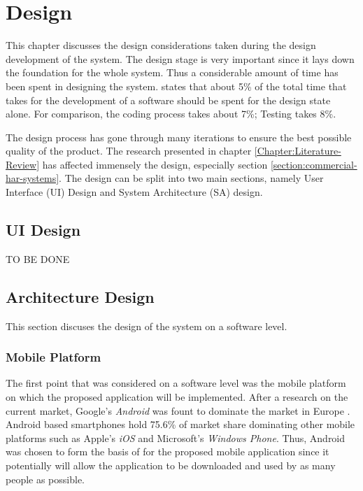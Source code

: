 \chapter{Design}
\label{Chapter:Design}

This chapter discusses the design considerations taken during the design development of the system. The design stage is very important since it lays down the foundation for the whole system.
Thus a considerable amount of time has been spent in designing the system. \citet[12]{bell2005} states that about 5\% of the total time that takes for the development of a software should be spent for the design state alone. For comparison, the coding process takes about 7\%; Testing takes 8\%. 

The design process has gone through many iterations to ensure the best possible quality of the product. The research presented in chapter \ref{Chapter:Literature-Review} has affected immensely the design, especially section \ref{section:commercial-har-systems}. The design can be split into two main sections, namely User Interface (UI) Design and System Architecture (SA) design.

    \section{UI Design}
    TO BE DONE
    
    \section{Architecture Design}
    This section discuses the design of the system on a software level.
    
        \subsection{Mobile Platform}
        The first point that was considered on a software level was the mobile platform on which the proposed application will be implemented. After a research on the current market, Google's \textit{Android} was fount to dominate the market in Europe \citep{williams2016}. Android based smartphones hold 75.6\% of market share dominating other mobile platforms such as Apple's \textit{iOS} and Microsoft's \textit{Windows Phone}. Thus, Android was chosen to form the basis of for the proposed mobile application since it potentially will allow the application to be downloaded and used by as many people as possible.